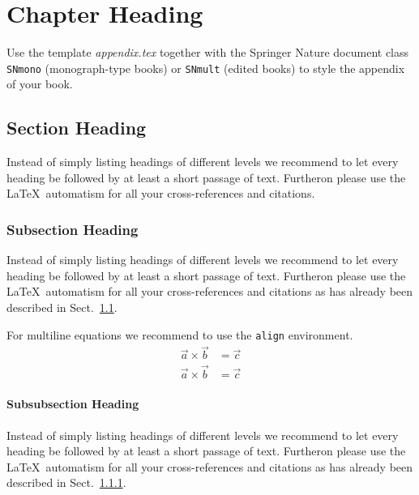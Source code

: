 %
%
%

\appendix
\chapter{Chapter Heading}
\label{introA} %

Use the template \emph{appendix.tex} together with the Springer Nature document class \texttt{SNmono} (monograph-type books) or \texttt{SNmult} (edited books) to style the appendix of your book.

\section{Section Heading}
\label{sec:A1}
Instead of simply listing headings of different levels we recommend to let every heading be followed by at least a short passage of text. Furtheron please use the \LaTeX\ automatism for all your cross-references and citations.

\subsection{Subsection Heading}
\label{sec:A2}
Instead of simply listing headings of different levels we recommend to let every heading be followed by at least a short passage of text. Furtheron please use the \LaTeX\ automatism for all your cross-references and citations as has already been described in Sect.~\ref{sec:A1}.

For multiline equations we recommend to use the \verb|align| environment.
\begin{align}
\vec{a}\times\vec{b}&=\vec{c} \nonumber\\
\vec{a}\times\vec{b}&=\vec{c}
\label{eq:A01}
\end{align}

\subsubsection{Subsubsection Heading}
Instead of simply listing headings of different levels we recommend to let every heading be followed by at least a short passage of text. Furtheron please use the \LaTeX\ automatism for all your cross-references and citations as has already been described in Sect.~\ref{sec:A2}.

